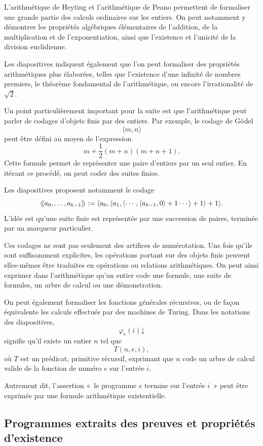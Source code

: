 \thingy
L'arithmétique de Heyting et l'arithmétique de Peano permettent de
formaliser une grande partie des calculs ordinaires sur les entiers.  On
peut notamment y démontrer les propriétés algébriques élémentaires de
l'addition, de la multiplication et de l'exponentiation, ainsi que
l'existence et l'unicité de la division euclidienne.

Les diapositives indiquent également que l'on peut formaliser des
propriétés arithmétiques plus élaborées, telles que l'existence d'une
infinité de nombres premiers, le théorème fondamental de l'arithmétique,
ou encore l'irrationalité de $\sqrt{2}$.

\thingy
Un point particulièrement important pour la suite est que l'arithmétique
peut parler de codages d'objets finis par des entiers.  Par exemple, le
codage de Gödel
\[
\langle m,n\rangle
\]
peut être défini au moyen de l'expression
\[
m+\frac{1}{2}(m+n)(m+n+1).
\]
Cette formule permet de représenter une paire d'entiers par un seul
entier.  En itérant ce procédé, on peut coder des suites finies.

Les diapositives proposent notamment le codage
\[
\mathopen{\langle\!\langle} a_0,\ldots,a_{k-1}\mathclose{\rangle\!\rangle}
:=
\langle
a_0,
\langle
a_1,
\langle\cdots,
\langle a_{k-1},0\rangle+1
\cdots\rangle+1
\rangle+1
\rangle.
\]
L'idée est qu'une suite finie est représentée par une succession de
paires, terminée par un marqueur particulier.

\thingy
Ces codages ne sont pas seulement des artifices de numérotation.  Une
fois qu'ils sont suffisamment explicites, les opérations portant sur des
objets finis peuvent elles-mêmes être traduites en opérations ou
relations arithmétiques.  On peut ainsi exprimer dans l'arithmétique
qu'un entier code une formule, une suite de formules, un arbre de calcul
ou une démonstration.

\thingy
On peut également formaliser les fonctions générales récursives, ou de
façon équivalente les calculs effectués par des machines de Turing.  Dans
les notations des diapositives,
\[
\varphi_e(i)\mathord\downarrow
\]
signifie qu'il existe un entier $n$ tel que
\[
T(n,e,i),
\]
où $T$ est un prédicat, primitive récursif, exprimant que $n$ code un
arbre de calcul valide de la fonction de numéro $e$ sur l'entrée $i$.

Autrement dit, l'assertion « le programme $e$ termine sur l'entrée
$i$ » peut être exprimée par une formule arithmétique existentielle.

\subsection{Programmes extraits des preuves et propriétés d'existence}

